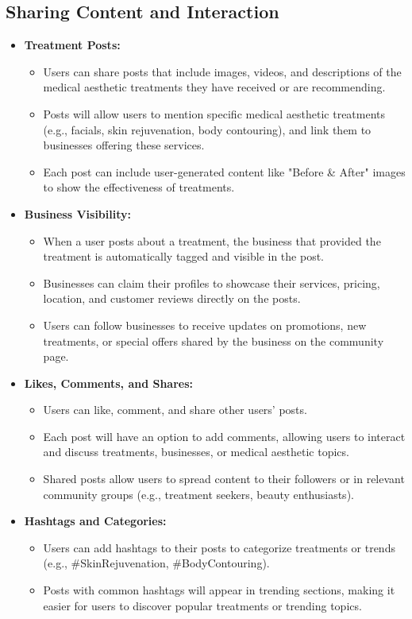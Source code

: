 \subsection{Sharing Content and Interaction}
\begin{itemize}
    \item \textbf{Treatment Posts:}
    \begin{itemize}
        \item Users can share posts that include images, videos, and descriptions of the medical aesthetic treatments they have received or are recommending.
        \item Posts will allow users to mention specific medical aesthetic treatments (e.g., facials, skin rejuvenation, body contouring), and link them to businesses offering these services.
        \item Each post can include user-generated content like "Before \& After" images to show the effectiveness of treatments.
    \end{itemize}
    
    \item \textbf{Business Visibility:}
    \begin{itemize}
        \item When a user posts about a treatment, the business that provided the treatment is automatically tagged and visible in the post.
        \item Businesses can claim their profiles to showcase their services, pricing, location, and customer reviews directly on the posts.
        \item Users can follow businesses to receive updates on promotions, new treatments, or special offers shared by the business on the community page.
    \end{itemize}
    
    \item \textbf{Likes, Comments, and Shares:}
    \begin{itemize}
        \item Users can like, comment, and share other users' posts.
        \item Each post will have an option to add comments, allowing users to interact and discuss treatments, businesses, or medical aesthetic topics.
        \item Shared posts allow users to spread content to their followers or in relevant community groups (e.g., treatment seekers, beauty enthusiasts).
    \end{itemize}
    
    \item \textbf{Hashtags and Categories:}
    \begin{itemize}
        \item Users can add hashtags to their posts to categorize treatments or trends (e.g., \#SkinRejuvenation, \#BodyContouring).
        \item Posts with common hashtags will appear in trending sections, making it easier for users to discover popular treatments or trending topics.
    \end{itemize}
\end{itemize}

